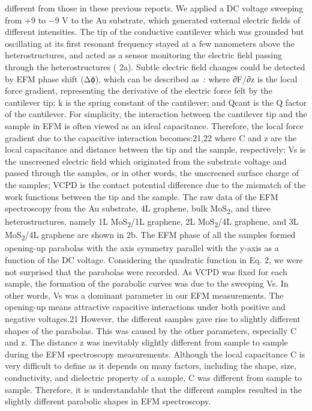 different from those in these previous reports. We applied a DC
voltage sweeping from +9 to −9 V to the Au substrate, which generated
external electric fields of different intensities. The tip of the
conductive cantilever which was grounded but oscillating at its first
resonant frequency stayed at a few nanometers above the
heterostructures, and acted as a sensor monitoring the electric field
passing through the heterostructures ( 2a). Subtle electric
field changes could be detected by EFM phase shift (Δϕ), which can be
described as~\cite{Li_2014_screen}:
where ∂F/∂z is the local force gradient, representing the derivative of the electric force felt by the cantilever tip; k is the spring constant of the cantilever; and Qcant is the Q factor of the cantilever. For simplicity, the interaction between the cantilever tip and the sample in EFM is often viewed as an ideal capacitance. Therefore, the local force gradient due to the capacitive interaction becomes:21,22
where C and z are the local capacitance and distance between the tip and the sample, respectively; Vs is the unscreened electric field which originated from the substrate voltage and passed through the samples, or in other words, the unscreened surface charge of the samples; VCPD is the contact potential difference due to the mismatch of the work functions between the tip and the sample. The raw data of the EFM spectroscopy from the Au substrate, 4L graphene, bulk MoS\textsubscript{2}, and three heterostructures, namely 1L MoS\textsubscript{2}/1L graphene, 2L MoS\textsubscript{2}/4L graphene, and 3L MoS\textsubscript{2}/4L graphene are shown in  2b. The EFM phase of all the samples formed opening-up parabolas with the axis symmetry parallel with the y-axis as a function of the DC voltage. Considering the quadratic function in Eq. 2, we were not surprised that the parabolas were recorded. As VCPD was fixed for each sample, the formation of the parabolic curves was due to the sweeping Vs. In other words, Vs was a dominant parameter in our EFM measurements. The opening-up means attractive capacitive interactions under both positive and negative voltages.21 However, the different samples gave rise to slightly different shapes of the parabolas. This was caused by the other parameters, especially C and z. The distance z was inevitably slightly different from sample to sample during the EFM spectroscopy measurements. Although the local capacitance C is very difficult to define as it depends on many factors, including the shape, size, conductivity, and dielectric property of a sample, C was different from sample to sample. Therefore, it is understandable that the different samples resulted in the slightly different parabolic shapes in EFM spectroscopy. 
